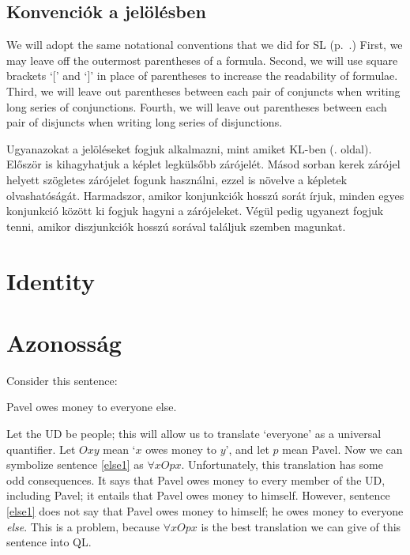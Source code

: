 \subsection{Konvenciók a jelölésben}	

We will adopt the same notational conventions that we did for SL (p.~\pageref{SLconventions}.) First, we may leave off the outermost parentheses of a formula. Second, we will use square brackets `[' and `]' in place of parentheses to increase the readability of formulae. Third, we will leave out parentheses between each pair of conjuncts when writing long series of conjunctions. Fourth, we will leave out parentheses between each pair of disjuncts when writing long series of disjunctions.

Ugyanazokat a jelöléseket fogjuk alkalmazni, mint amiket KL-ben (\pageref{SLconventions}. oldal). Először is kihagyhatjuk a képlet legkülsőbb zárójelét. Másod sorban kerek zárójel helyett szögletes zárójelet fogunk használni, ezzel is növelve a képletek olvashatóságát. Harmadszor, amikor konjunkciók hosszú sorát írjuk, minden egyes konjunkció között ki fogjuk hagyni a zárójeleket. Végül pedig ugyanezt fogjuk tenni, amikor diszjunkciók hosszú sorával találjuk szemben magunkat.



\section{Identity}
\label{sec.identity}

\section{Azonosság}
\label{sec.azonosság}

Consider this sentence:
\begin{earg}
\item[\ex{else1}] Pavel owes money to everyone else.
\end{earg}
Let the UD be people; this will allow us to translate `everyone' as a universal quantifier. Let $Oxy$ mean `$x$ owes money to $y$', and let $p$ mean Pavel. Now we can symbolize sentence \ref{else1} as $\forall x Opx$. Unfortunately, this translation has some odd consequences. It says that Pavel owes money to every member of the UD, including Pavel; it entails that Pavel owes money to himself. However, sentence \ref{else1} does not say that Pavel owes money to himself; he owes money to everyone \emph{else}. This is a problem, because $\forall x Opx$ is the best translation we can give of this sentence into QL.

